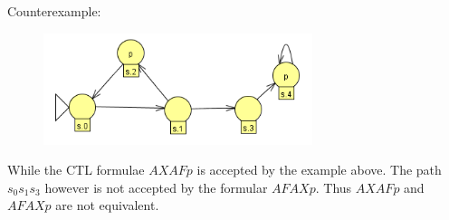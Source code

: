 

Counterexample: 

\begin{figure}[h]
	\centering
	\includegraphics[width=0.7\textwidth]{Gegenbeispiel.png}
\end{figure}

While the CTL formulae $AXAFp$ is accepted by the example above. The path $s_0s_1s_3$ however is not accepted by the formular $AFAXp$. Thus $AXAFp$ and $AFAXp$ are not equivalent.


